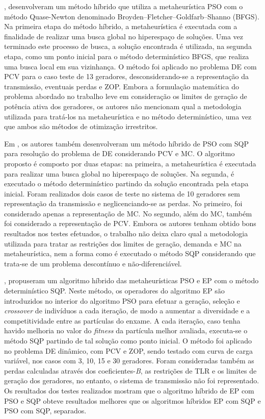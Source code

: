 \documentclass[
	12pt,				%
	openany,			%
	twoside,			%
	a4paper,			%
	chapter=TITLE,		%
	section=Title,		%
	subsection=Title,	%
	subsubsection=Title,%
	english,			%
	french,				%
	spanish,			%
	brazil			%
	]{abntex2}
\begin{document}
\begin{ERRATA}
, desenvolveram um método híbrido que utiliza a metaheurística PSO com o método Quase-Newton denominado Broyden–Fletcher–Goldfarb–Shanno (BFGS). Na primeira etapa do método híbrido, a metaheurística é executada com a finalidade de realizar uma busca global no hiperespaço de soluções. Uma vez terminado este processo de busca, a solução encontrada é utilizada, na segunda etapa, como um ponto inicial para o método determinístico BFGS, que realiza uma busca local em sua vizinhança. O método foi aplicado no problema DE com PCV para o caso teste de 13 geradores, desconsiderando-se a representação da transmissão, eventuais perdas e ZOP. Embora a formulação matemática do problema abordado no trabalho leve em consideração os limites de geração de potência ativa dos geradores, os autores não mencionam qual a metodologia utilizada para tratá-los na metaheurística e no método determinístico, uma vez que ambos são métodos de otimização irrestritos.

Em , os autores também desenvolveram um método híbrido de PSO com SQP para resolução do problema de DE considerando PCV e MC. O algoritmo proposto é composto por duas etapas: na primeira, a metaheurística é executada para realizar uma busca global no hiperespaço de soluções. Na segunda, é executado o método determinístico partindo da solução encontrada pela etapa inicial. Foram realizados dois casos de teste no sistema de 10 geradores sem representação da transmissão e neglicenciando-se as perdas. No primeiro, foi considerado apenas a representação de MC. No segundo, além do MC, também foi considerado a representação de PCV. Embora os autores tenham obtido bons resultados nos testes efetuados, o trabalho não deixa claro qual a metodologia utilizada para tratar as restrições dos limites de geração, demanda e MC na metaheurística, nem a forma como é executado o método SQP considerando que trata-se de um problema descontínuo e não-diferenciável.


, propuseram um algoritmo híbrido das metaheurísticas PSO e EP com o método determinístico SQP. Neste método, os operadores do algoritmo EP são introduzidos no interior do algoritmo PSO para efetuar a geração, seleção e \emph{crossover} de indivíduos a cada iteração, de modo a aumentar a diversidade e a competitividade entre as partículas do enxame. A cada iteração, caso tenha havido melhoria no valor do \emph{fitness} da partícula melhor avaliada, executa-se o método SQP partindo de tal solução como ponto inicial. O método foi aplicado no problema DE dinâmico, com PCV e ZOP, sendo testado com curva de carga variável, nos casos com 3, 10, 15 e 30 geradores. Foram consideradas também as perdas calculadas através dos coeficientes-\emph{B}, as restrições de TLR e os limites de geração dos geradores, no entanto, o sistema de transmissão não foi representado. Os resultados dos testes realizados mostram que o algoritmo híbrido de EP com PSO e SQP obteve resultados melhores que os algoritmos híbridos EP com SQP e PSO com SQP, separados.


\end{ERRATA}
\end{document}
